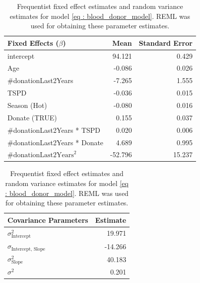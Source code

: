 \begin{table}[!htb]
\centering
\captionsetup{justification=centering}
\caption{Frequentist fixed effect estimates and random variance estimates for model \ref{eq : blood_donor_model}. REML was used for obtaining these parameter estimates.}
\label{table : frequentist_fixed effects}
\begin{tabular}{@{}lrr@{}}
\toprule
Fixed Effects ($\beta$) & Mean & Standard Error \\ \midrule
intercept & 94.121 & 0.429 \\
Age & -0.086 & 0.026 \\
\#donationLast2Years & -7.265 & 1.555 \\
TSPD & -0.036 & 0.015 \\
Season (Hot) & -0.080 & 0.016 \\
Donate (TRUE) & 0.155 & 0.037 \\
\#donationLast2Years * TSPD & 0.020 & 0.006 \\
\#donationLast2Years * Donate & 4.689 & 0.995 \\
$\text{\#donationLast2Years}^2$ & -52.796 & 15.237 \\ \bottomrule
\end{tabular}

\begin{tabular}{@{}lr@{}}
\toprule
Covariance Parameters & Estimate \\ \midrule
$\sigma^2_\text{Intercept}$ & 19.971 \\
$\sigma_\text{Intercept, Slope}$ & -14.266 \\
$\sigma^2_\text{Slope}$ & 40.183 \\
$\sigma^2$ & 0.201 \\ \bottomrule
\end{tabular}
\end{table}

